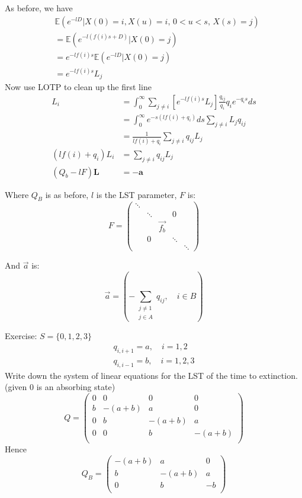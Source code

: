 \documentclass{X:/Documents/Coding/Latex/myassignment}
\begin{document}
As before, we have
\begin{align*}
&\mathbb{E}\left(e^{-lD} | X(0) = i, X(u) = i , \, 0<u<s, \, X(s) = j\right)    \\
&= \mathbb{E}\left(e^{-l(f(i)s + D)} | X(0) = j\right)\\
&= e^{-lf(i)s}\mathbb{E}\left(e^{-lD} | X(0) = j\right)\\
&= e^{-lf(i)s} L_j
\end{align*}
Now use LOTP to clean up the first line
\begin{align*}
    L_i &= \int_0^\infty \sum_{j\neq i} \left[e^{-lf(i)s} L_j\right] \frac{q_{ij}}{q_i} q_i e^{-q_is} ds\\
    &=\int_0^\infty  e^{-s(lf(i)+q_i)} ds\sum_{j\neq i}L_j q_{ij} \\
    &= \frac{1}{l f(i)+ q_i} \sum_{j\neq i} q_{ij} L_j\\
    (l f(i) + q_i) L_i &= \sum_{j\neq i} q_{ij} L_j\\
    (Q_b - lF)\mathbf{L} &= - \mathbf{a}
\end{align*}

Where $Q_B$ is as before, $l$ is the LST parameter, $F$ is:
\[F = \begin{pmatrix}
    \ddots & \\
    &\ddots&&0\\
    &&\vec{f_b}&&\\
    &0&&\ddots\\
    &&&&\ddots 
\end{pmatrix}\]

And $\vec{a}$ is:
\[\vec a = \left(- \sum_{\substack{j\neq 1\\ j\in A}} q_{ij}, \quad i\in B\right)\]

Exercise:
$S = \{0,1,2,3\}$
\begin{align*}
    q_{i,i+1} = a,\quad i=1,2\\
    q_{i,i-1} = b,\quad i=1,2,3
\end{align*}
Write down the system of linear equations for the LST of the time to extinction. (given 0 is an absorbing state)
\[Q = \begin{pmatrix}
    0&0&0&0\\
    b & -(a+b) & a & 0\\
    0&b & -(a+b) & a\\
    0&0&b & -(a+b)\\
\end{pmatrix}\]
Hence
\[Q_B = \begin{pmatrix}
    -(a+b) & a & 0\\
    b & -(a+b) & a\\
    0&b & -b\\
\end{pmatrix}\]
\end{document}
